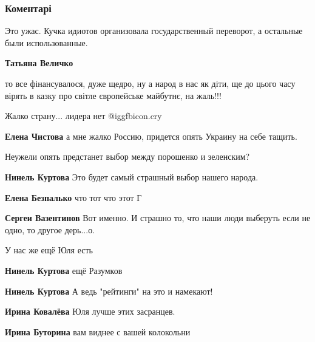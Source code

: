  
 
 
 
 
\subsubsection{Коментарі}

\begin{itemize} %
Это ужас. Кучка идиотов организовала государственный переворот, а остальные были использованные.

\textbf{Татьяна Величко} 

то все фінансувалося, дуже щедро, ну а народ в нас як діти, ще до цього часу
вірять в казку про світле європейське майбутнє, на жаль!!!

Жалко страну... лидера нет @igg{fbicon.cry} 

\textbf{Елена Чистова} а мне жалко Россию, придется опять Украину на себе тащить.

Неужели опять предстанет выбор между порошенко и зеленским?

\begin{itemize} %
\textbf{Нинель Куртова} Это будет самый страшный выбор нашего народа.

\textbf{Елена Безпалько} что тот что этот Г

\textbf{Сергеи Вазентинов} Вот именно. И страшно то, что наши люди выберуть если не одно, то другое дерь...о.

У нас же ещё Юля есть

\textbf{Нинель Куртова} ещё Разумков

\textbf{Нинель Куртова} А ведь "рейтинги" на это и намекают!

\textbf{Ирина Ковалёва} Юля лучше этих засранцев.

\textbf{Ирина Буторина} вам виднее с вашей колокольни

\end{itemize} %


\end{itemize}
